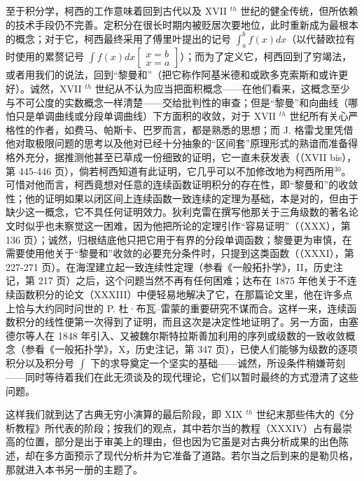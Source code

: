 至于积分学，柯西的工作意味着回到古代以及 XVII \(^{th}\) 世纪的健全传统，但所依赖的技术手段仍不完善。定积分在很长时期内被贬居次要地位，此时重新成为最根本的概念；对于它，柯西最终采用了傅里叶提出的记号 \(\int_{a}^{b} f(x) dx\)（以代替欧拉有时使用的累赘记号 \(\int f(x) dx \left[ \begin{array}{c} x = b \\ x = a \end{array} \right]\)）；而为了定义它，柯西回到了穷竭法，或者用我们的说法，回到“黎曼和”（把它称作阿基米德和或欧多克索斯和或许更好）。诚然，XVII \(^{th}\) 世纪从不认为应当把面积概念——在他们看来，这概念至少与不可公度的实数概念一样清楚——交给批判性的审查；但是“黎曼”和向曲线（哪怕只是单调曲线或分段单调曲线）下方面积的收敛，对于 XVII \(^{th}\) 世纪所有关心严格性的作者，如费马、帕斯卡、巴罗而言，都是熟悉的思想；而 J. 格雷戈里凭借他对取极限问题的思考以及他对已经十分抽象的“区间套”原理形式的熟谙而准备得格外充分，据推测他甚至已草成一份细致的证明，它一直未获发表（（XVII bis），第 445-446 页），倘若柯西知道有此证明，它几乎可以不加修改地为柯西所用\(^{30}\)。可惜对他而言，柯西竟想对任意的连续函数证明积分的存在性，即“黎曼和”的收敛性；他的证明如果以闭区间上连续函数一致连续的定理为基础，本是对的，但由于缺少这一概念，它不具任何证明效力。狄利克雷在撰写他那关于三角级数的著名论文时似乎也未察觉这一困难，因为他把所论的定理引作“容易证明”（（XXX），第 136 页）；诚然，归根结底他只把它用于有界的分段单调函数；黎曼更为审慎，在需要使用他关于“黎曼和”收敛的必要充分条件时，只提到这类函数（（XXXI），第 227-271 页）。在海涅建立起一致连续性定理（参看《一般拓扑学》，II，历史注记，第 217 页）之后，这个问题当然不再有任何困难；达布在 1875 年他关于不连续函数积分的论文（XXXIII）中便轻易地解决了它，在那篇论文里，他在许多点上恰与大约同时问世的 P. 杜·布瓦–雷蒙的重要研究不谋而合。这样一来，连续函数积分的线性便第一次得到了证明，而且这次是决定性地证明了。另一方面，由塞德尔等人在 1848 年引入、又被魏尔斯特拉斯善加利用的序列或级数的一致收敛概念（参看《一般拓扑学》，X，历史注记，第 347 页），已使人们能够为级数的逐项积分以及积分号 \(\int\) 下的求导奠定一个坚实的基础——诚然，所设条件稍嫌苛刻——同时等待着我们在此无须谈及的现代理论，它们以暂时最终的方式澄清了这些问题。

这样我们就到达了古典无穷小演算的最后阶段，即 XIX \(^{th}\) 世纪末那些伟大的《分析教程》所代表的阶段；按我们的观点，其中若尔当的教程（XXXIV）占有最崇高的位置，部分是出于审美上的理由，但也因为它虽是对古典分析成果的出色陈述，却在多方面预示了现代分析并为它准备了道路。若尔当之后到来的是勒贝格，那就进入本书另一册的主题了。

